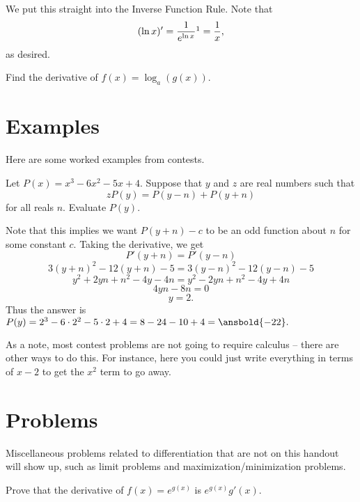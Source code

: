 \documentclass{article}
\begin{document}
\begin{pro}
We put this straight into the Inverse Function Rule. Note that
\[(\ln x)'=\frac{1}{e^{\ln x}}\footnote{Remember that the derivative of $e^x$ is itself.}=\frac{1}{x},\]
as desired.
\end{pro}

\begin{exer}
Find the derivative of $f(x)=\log_a(g(x)).$
\end{exer}

\section{Examples}

Here are some worked examples from contests.

\begin{exam}[CHMMC 2021/4]
Let $P(x)=x^3-6x^2-5x+4.$ Suppose that $y$ and $z$ are real numbers such that
\[zP(y)=P(y-n)+P(y+n)\]
for all reals $n.$ Evaluate $P(y).$
\end{exam}

\begin{sol}
Note that this implies we want $P(y+n)-c$ to be an odd function about $n$ for some constant $c.$ Taking the derivative, we get
\[P'(y+n)=P'(y-n)\]
\[3(y+n)^2-12(y+n)-5=3(y-n)^2-12(y-n)-5\]
\[y^2+2yn+n^2-4y-4n=y^2-2yn+n^2-4y+4n\]
\[4yn-8n=0\]
\[y=2.\]
Thus the answer is $P(y)=2^3-6\cdot 2^2-5\cdot 2+4=8-24-10+4=\ansbold{-22}.$
\end{sol}

As a note, most contest problems are not going to require calculus -- there are other ways to do this. For instance, here you could just write everything in terms of $x-2$ to get the $x^2$ term to go away.

\pagebreak

\section{Problems}

Miscellaneous problems related to differentiation that are not on this handout will show up, such as limit problems and maximization/minimization problems.
\\

\noindent{}


\begin{req}[]{2}
Prove that the derivative of $f(x)=e^{g(x)}$ is $e^{g(x)}g'(x).$
\end{req}
\end{document}
